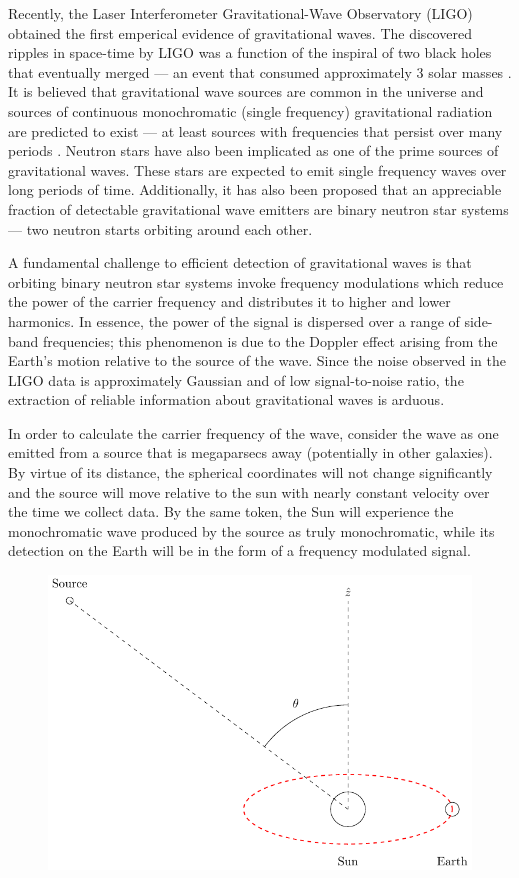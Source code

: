 \documentclass[onecolumn, groupedaddress, 10pt]{revtex4-1}
\begin{document}
Recently, the Laser Interferometer Gravitational-Wave Observatory (LIGO) obtained the first emperical evidence of gravitational waves. The discovered ripples in space-time by LIGO was a function of the inspiral of two black holes that eventually merged --- an event that consumed approximately 3 solar masses \citep{abbott}.  It is believed that gravitational wave sources are common in the universe and sources of continuous monochromatic (single frequency) gravitational radiation are predicted to exist --- at least sources with frequencies that persist over many periods \cite{}. Neutron stars have also been implicated as one of the prime sources of gravitational waves.  These stars are expected to emit single frequency waves over long periods of time.  Additionally, it has also been proposed that an appreciable fraction of detectable gravitational wave emitters are binary neutron star systems --- two neutron starts orbiting around each other.

A fundamental challenge to efficient detection of gravitational waves is that orbiting binary neutron star systems invoke frequency modulations which reduce the power of the carrier frequency and distributes it to higher and lower harmonics.  In essence, the power of the signal is dispersed over a range of side-band frequencies; this phenomenon is due to the Doppler effect arising from the Earth's motion relative to the source of the wave. Since the noise observed in the LIGO data is approximately Gaussian and of low signal-to-noise ratio, the extraction of reliable information about gravitational waves is arduous.

In order to calculate the carrier frequency of the wave, consider the wave as one emitted from a source that is megaparsecs away (potentially in other galaxies). By virtue of its distance, the spherical coordinates will not change significantly and the source will move relative to the sun with nearly constant velocity over the time we collect data. By the same token, the Sun will experience the monochromatic wave produced by the source as truly monochromatic, while its detection on the Earth will be in the form of a frequency modulated signal.

\begin{figure}[ht]
	\centering
	\includegraphics[width=.75\linewidth]{earthMotionModulationFigure.pdf}
	\caption{\label{fig:earthMotionModulationFigure}}
\end{figure}
\end{document}
